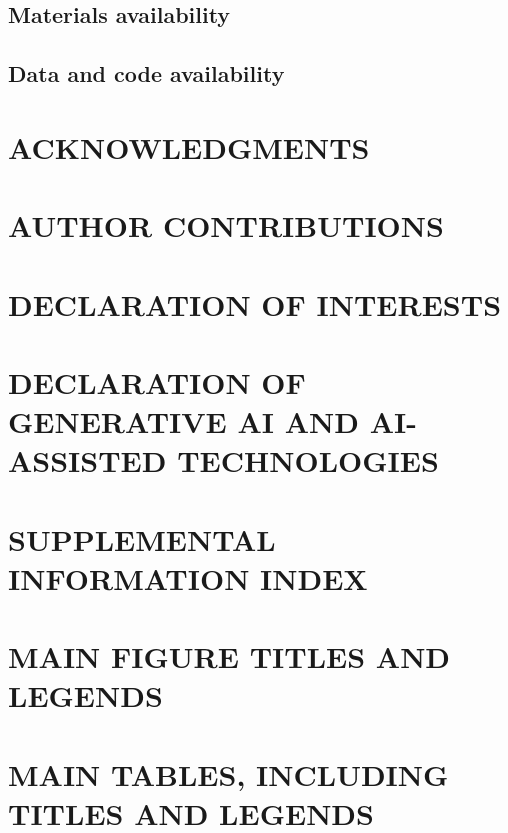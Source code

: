 \documentclass[12pt,letterpaper]{article}
\begin{document}
\subsection*{Materials availability}


\subsection*{Data and code availability}



\section*{ACKNOWLEDGMENTS}


\section*{AUTHOR CONTRIBUTIONS}


\section*{DECLARATION OF INTERESTS}


\section*{DECLARATION OF GENERATIVE AI AND AI-ASSISTED TECHNOLOGIES}



\section*{SUPPLEMENTAL INFORMATION INDEX}



\newpage
\section*{MAIN FIGURE TITLES AND LEGENDS}

\newpage
\section*{MAIN TABLES, INCLUDING TITLES AND LEGENDS}

\end{document}
